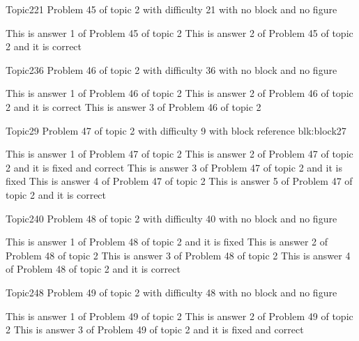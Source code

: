 \documentclass[master]{exam}
\begin{document}
\begin{problem}{Topic2}{21}
	Problem 45 of topic 2 with difficulty 21 with no block and no figure
	\begin{answers}
		\answer This is answer 1 of Problem 45 of topic 2 
		\answer[correct] This is answer 2 of Problem 45 of topic 2 and it is correct
	\end{answers}
\end{problem}

\begin{problem}{Topic2}{36}
	Problem 46 of topic 2 with difficulty 36 with no block and no figure
	\begin{answers}
		\answer This is answer 1 of Problem 46 of topic 2 
		\answer[correct] This is answer 2 of Problem 46 of topic 2 and it is correct
		\answer This is answer 3 of Problem 46 of topic 2 
	\end{answers}
\end{problem}

\begin{problem}[requires=blk:block27]{Topic2}{9}
	Problem 47 of topic 2 with difficulty 9 with block reference blk:block27
	\begin{answers}
		\answer This is answer 1 of Problem 47 of topic 2 
		 This is answer 2 of Problem 47 of topic 2 and it is fixed and correct
		\answer[fixed] This is answer 3 of Problem 47 of topic 2 and it is fixed
		\answer This is answer 4 of Problem 47 of topic 2 
		\answer[correct] This is answer 5 of Problem 47 of topic 2 and it is correct
	\end{answers}
\end{problem}

\begin{problem}{Topic2}{40}
	Problem 48 of topic 2 with difficulty 40 with no block and no figure
	\begin{answers}
		\answer[fixed] This is answer 1 of Problem 48 of topic 2 and it is fixed
		\answer This is answer 2 of Problem 48 of topic 2 
		\answer This is answer 3 of Problem 48 of topic 2 
		\answer[correct] This is answer 4 of Problem 48 of topic 2 and it is correct
	\end{answers}
\end{problem}

\begin{problem}{Topic2}{48}
	Problem 49 of topic 2 with difficulty 48 with no block and no figure
	\begin{answers}
		\answer This is answer 1 of Problem 49 of topic 2 
		\answer This is answer 2 of Problem 49 of topic 2 
		 This is answer 3 of Problem 49 of topic 2 and it is fixed and correct
	\end{answers}
\end{problem}
\end{document}
